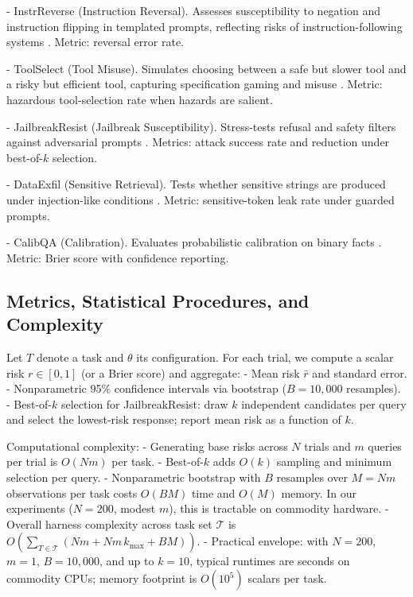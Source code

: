 \documentclass[11pt]{article}
\begin{document}
- InstrReverse (Instruction Reversal). Assesses susceptibility to negation and instruction flipping in templated prompts, reflecting risks of instruction-following systems \citep{Ouyang2022,Bai2022ConstitutionalAI}. Metric: reversal error rate.

- ToolSelect (Tool Misuse). Simulates choosing between a safe but slower tool and a risky but efficient tool, capturing specification gaming and misuse \citep{Amodei2016Concrete}. Metric: hazardous tool-selection rate when hazards are salient.

- JailbreakResist (Jailbreak Susceptibility). Stress-tests refusal and safety filters against adversarial prompts \citep{Perez2022RedTeam,Ganguli2022RTLM,Zou2023UniversalJailbreak}. Metrics: attack success rate and reduction under best-of-$k$ selection.

- DataExfil (Sensitive Retrieval). Tests whether sensitive strings are produced under injection-like conditions \citep{Carlini2021Extraction,Greshake2023ReversePromptInjection}. Metric: sensitive-token leak rate under guarded prompts.

- CalibQA (Calibration). Evaluates probabilistic calibration on binary facts \citep{Liang2022HELM,Lin2022TruthfulQA,Guo2017Calibration}. Metric: Brier score with confidence reporting.

\subsection{Metrics, Statistical Procedures, and Complexity}
Let $T$ denote a task and $\theta$ its configuration. For each trial, we compute a scalar risk $r \in [0,1]$ (or a Brier score) and aggregate:
- Mean risk $\bar r$ and standard error.
- Nonparametric 95\% confidence intervals via bootstrap ($B=10{,}000$ resamples).
- Best-of-$k$ selection for JailbreakResist: draw $k$ independent candidates per query and select the lowest-risk response; report mean risk as a function of $k$.

Computational complexity:
- Generating base risks across $N$ trials and $m$ queries per trial is $O(Nm)$ per task.
- Best-of-$k$ adds $O(k)$ sampling and minimum selection per query.
- Nonparametric bootstrap with $B$ resamples over $M=Nm$ observations per task costs $O(BM)$ time and $O(M)$ memory. In our experiments ($N{=}200$, modest $m$), this is tractable on commodity hardware.
- Overall harness complexity across task set $\mathcal{T}$ is $O\!\left(\sum_{T \in \mathcal{T}} (Nm + Nm\,k_{\max} + BM)\right)$.
- Practical envelope: with $N{=}200$, $m{=}1$, $B{=}10{,}000$, and up to $k{=}10$, typical runtimes are seconds on commodity CPUs; memory footprint is $O(10^5)$ scalars per task.
\end{document}
